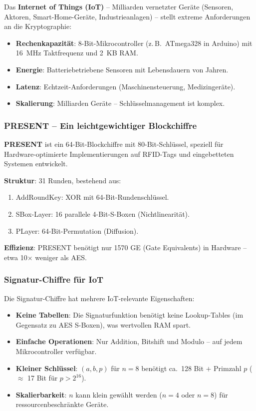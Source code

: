 ﻿\documentclass[a4paper,12pt]{scrreprt}
\theoremstyle{definition}
\begin{document}
Das \textbf{Internet of Things (IoT)} -- Milliarden vernetzter Geräte (Sensoren, Aktoren, Smart-Home-Geräte, Industrieanlagen) -- stellt extreme Anforderungen an die Kryptographie:

\begin{itemize}
    \item \textbf{Rechenkapazität}: 8-Bit-Mikrocontroller (z.\,B.\ ATmega328 in Arduino) mit 16~MHz Taktfrequenz und 2~KB RAM.
    \item \textbf{Energie}: Batteriebetriebene Sensoren mit Lebensdauern von Jahren.
    \item \textbf{Latenz}: Echtzeit-Anforderungen (Maschinensteuerung, Medizingeräte).
    \item \textbf{Skalierung}: Milliarden Geräte -- Schlüsselmanagement ist komplex.
\end{itemize}

\subsubsection{PRESENT -- Ein leichtgewichtiger Blockchiffre}

\textbf{PRESENT} \cite{BSW07} ist ein 64-Bit-Blockchiffre mit 80-Bit-Schlüssel, speziell für Hardware-optimierte Implementierungen auf RFID-Tags und eingebetteten Systemen entwickelt.

\textbf{Struktur}: 31 Runden, bestehend aus:
\begin{enumerate}
    \item AddRoundKey: XOR mit 64-Bit-Rundenschlüssel.
    \item SBox-Layer: 16 parallele 4-Bit-S-Boxen (Nichtlinearität).
    \item PLayer: 64-Bit-Permutation (Diffusion).
\end{enumerate}

\textbf{Effizienz}: PRESENT benötigt nur 1570 GE (Gate Equivalents) in Hardware -- etwa 10$\times$ weniger als AES.

\subsubsection{Signatur-Chiffre für IoT}

Die Signatur-Chiffre hat mehrere IoT-relevante Eigenschaften:
\begin{itemize}
    \item \textbf{Keine Tabellen}: Die Signaturfunktion benötigt keine Lookup-Tables (im Gegensatz zu AES S-Boxen), was wertvollen RAM spart.
    \item \textbf{Einfache Operationen}: Nur Addition, Bitshift und Modulo -- auf jedem Mikrocontroller verfügbar.
    \item \textbf{Kleiner Schlüssel}: $(a, b, p)$ für $n=8$ benötigt ca.\ 128 Bit $+$ Primzahl $p$ ($\approx$ 17 Bit für $p > 2^{16}$).
    \item \textbf{Skalierbarkeit}: $n$ kann klein gewählt werden ($n=4$ oder $n=8$) für ressourcenbeschränkte Geräte.
\end{itemize}
\end{document}
